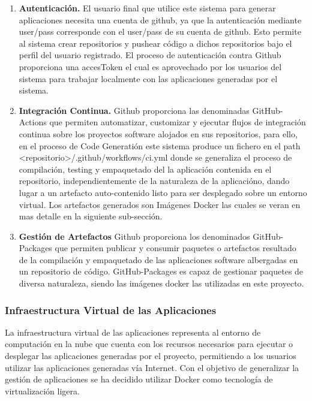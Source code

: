 \documentclass[a4paper,11pt]{book}
\begin{document}
\begin{enumerate}
\item \textbf{ Autenticación.} El usuario final que utilice este sistema para generar aplicaciones necesita una cuenta de github, ya que la autenticación mediante user/pass corresponde con el user/pass de su cuenta de github. Esto permite al sistema crear repositorios y pushear código a dichos repositorios bajo el perfil del usuario registrado. El proceso de autenticación contra Github proporciona una accesToken el cual es aprovechado por los usuarios del sistema para trabajar localmente con las aplicaciones generadas por el sistema.

\item   \textbf{Integración Continua.} Github proporciona las denominadas GitHub-Actions\cite{github3}  que permiten automatizar, customizar y ejecutar flujos de integración continua  sobre los proyectos software alojados en sus repositorios, para ello, en el proceso de Code Generatión este sistema produce un fichero  en el path  <repositorio>/.github/workflows/ci.yml donde se generaliza el proceso de compilación, testing y empaquetado del la aplicación contenida en el repositorio, independientemente de la naturaleza de la aplicacióno, dando lugar a un artefacto auto-contenido listo para ser desplegado sobre un entorno virtual. Los artefactos generados son Imágenes Docker las cuales se veran en mas detalle en la siguiente sub-sección.

\item \textbf{Gestión de Artefactos} Github proporciona los denominados GitHub-Packages\cite{github4} que permiten publicar y consumir paquetes o artefactos resultado de la compilación y empaquetado de las aplicaciones software albergadas en un repositorio de código. GitHub-Packages es capaz de gestionar paquetes de diversa naturaleza, siendo las imágenes docker las utilizadas en este proyecto.
\end{enumerate}

\subsubsection{Infraestructura Virtual de las Aplicaciones}

La infraestructura virtual de las aplicaciones  representa al entorno de computación en la nube que cuenta con los recursos necesarios para ejecutar o desplegar las aplicaciones generadas por el proyecto, permitiendo a los usuarios utilizar las aplicaciones generadas vía Internet.
Con el objetivo de generalizar la gestión de aplicaciones  se ha decidido utilizar Docker como tecnología de virtualización ligera.
\end{document}
